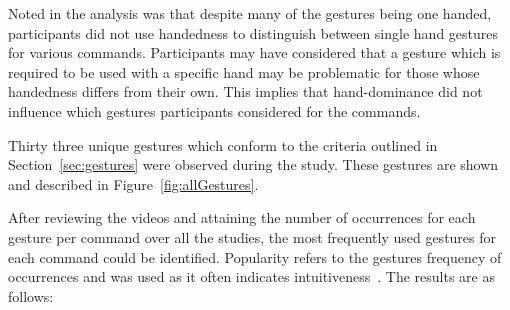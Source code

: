 \documentclass[manuscript, review, screen]{acmart}
\begin{document}
Noted in the analysis was that despite many of the gestures being one handed, participants did not use handedness to distinguish between single hand gestures for various commands.
Participants may have considered that a gesture which is required to be used with a specific hand may be problematic for those whose handedness differs from their own.
This implies that hand-dominance did not influence which gestures participants considered for the commands.

Thirty three unique gestures which conform to the criteria outlined in Section~\ref{sec:gestures} were observed during the study.
These gestures are shown and described in Figure~\ref{fig:allGestures}.  

After reviewing the videos and attaining the number of occurrences for each gesture per command over all the studies, the most frequently used gestures for each command could be identified.
Popularity refers to the gestures frequency of occurrences and was used as it often indicates intuitiveness~\cite{Grandhi2011}.
The results are as follows: \\
\end{document}
